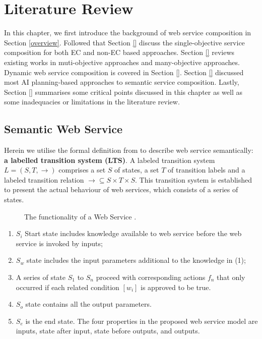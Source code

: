 \chapter{Literature Review}\label{C:review}

In this chapter, we first introduce the background of web service composition in Section \ref{overview}.  Followed that Section \ref{} discuss the single-objective service composition for both EC and non-EC based approaches. Section  \ref{} reviews existing works in muti-objective approaches and many-objective approaches.  Dynamic web service composition is covered in Section \ref{}. Section \ref{}  discussed most AI planning-based approaches to semantic service composition. Lastly, Section \ref{} summarises some critical points discussed in this chapter as well as some inadequacies or limitations in the literature review. 
\section{Semantic Web Service}\label{sevice}


Herein we utilise the formal definition from \cite{agarwal2010d5} to describe web service semantically: \textbf{a labelled transition system (LTS)}. A labeled transition system $L = (S,T,\rightarrow)$ comprises a set $S$ of states, a set $T$ of transition labels and a labeled transition relation $\rightarrow \subseteq S \times T \times S$. This transition system is established to present the actual behaviour of web services, which consists of a series of states. 

\begin{figure}
\centerline{
}
\caption{ The functionality of a Web Service \cite{agarwal2010d5}.}
\label{fig:lts}
\end{figure}


\begin{enumerate}

\item $S_i$ Start state includes knowledge available to web service before the web service is invoked by inputs; 
\item $S_w$ state includes the input parameters additional to the knowledge in (1); 
\item A series of state $S_1$ to $S_n$ proceed with corresponding actions $f_n$ that only occurred if each related condition $[w_i]$ is approved to be true. 
\item $S_o$ state contains all the output parameters. 
\item $S_e$ is the end state.  The four properties in the proposed web service model are inputs, state after input, state before outputs, and outputs. 
\end{enumerate}



